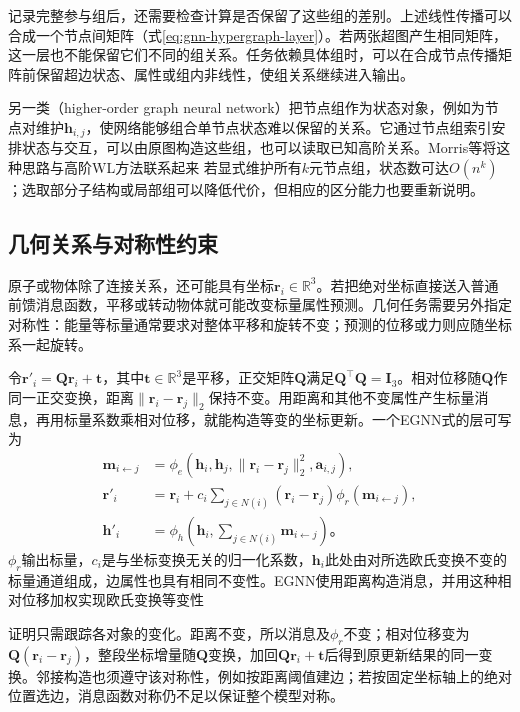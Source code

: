 记录完整参与组后，还需要检查计算是否保留了这些组的差别。上述线性传播可以合成一个节点间矩阵（式\eqref{eq:gnn-hypergraph-layer}）。若两张超图产生相同矩阵，这一层也不能保留它们不同的组关系。任务依赖具体组时，可以在合成节点传播矩阵前保留超边状态、属性或组内非线性，使组关系继续进入输出。

另一类（higher-order graph neural network）把节点组作为状态对象，例如为节点对维护$\bm{h}_{i,j}$，使网络能够组合单节点状态难以保留的关系。它通过节点组索引安排状态与交互，可以由原图构造这些组，也可以读取已知高阶关系。Morris等将这种思路与高阶WL方法联系起来 若显式维护所有$k$元节点组，状态数可达$O(n^k)$；选取部分子结构或局部组可以降低代价，但相应的区分能力也要重新说明。

\subsection{几何关系与对称性约束}
\label{sec:gnn-geometric}

原子或物体除了连接关系，还可能具有坐标$\bm{r}_i\in\mathbb{R}^{3}$。若把绝对坐标直接送入普通前馈消息函数，平移或转动物体就可能改变标量属性预测。几何任务需要另外指定对称性：能量等标量通常要求对整体平移和旋转不变；预测的位移或力则应随坐标系一起旋转。

令$\bm{r}'_i=\bm{Q}\bm{r}_i+\bm{t}$，其中$\bm{t}\in\mathbb{R}^{3}$是平移，正交矩阵$\bm{Q}$满足$\bm{Q}^{\top}\bm{Q}=\bm{I}_3$。相对位移随$\bm{Q}$作同一正交变换，距离$\lVert\bm{r}_i-\bm{r}_j\rVert_2$保持不变。用距离和其他不变属性产生标量消息，再用标量系数乘相对位移，就能构造等变的坐标更新。一个EGNN式的层可写为
\begin{equation}
  \begin{aligned}
    \bm{m}_{i\leftarrow j}
      &=\phi_e(\bm{h}_i,\bm{h}_j,
        \lVert\bm{r}_i-\bm{r}_j\rVert_2^2,\bm{a}_{i,j}),\\
    \bm{r}'_i&=\bm{r}_i+
      c_i\sum_{j\in N(i)}(\bm{r}_i-\bm{r}_j)\phi_r(\bm{m}_{i\leftarrow j}),\\
    \bm{h}'_i&=\phi_h\!\left(\bm{h}_i,\sum_{j\in N(i)}\bm{m}_{i\leftarrow j}\right)\text{。}
  \end{aligned}
  \label{eq:gnn-egnn}
\end{equation}
$\phi_r$输出标量，$c_i$是与坐标变换无关的归一化系数，$\bm{h}_i$此处由对所选欧氏变换不变的标量通道组成，边属性也具有相同不变性。EGNN使用距离构造消息，并用这种相对位移加权实现欧氏变换等变性

证明只需跟踪各对象的变化。距离不变，所以消息及$\phi_r$不变；相对位移变为$\bm{Q}(\bm{r}_i-\bm{r}_j)$，整段坐标增量随$\bm{Q}$变换，加回$\bm{Q}\bm{r}_i+\bm{t}$后得到原更新结果的同一变换。邻接构造也须遵守该对称性，例如按距离阈值建边；若按固定坐标轴上的绝对位置选边，消息函数对称仍不足以保证整个模型对称。

